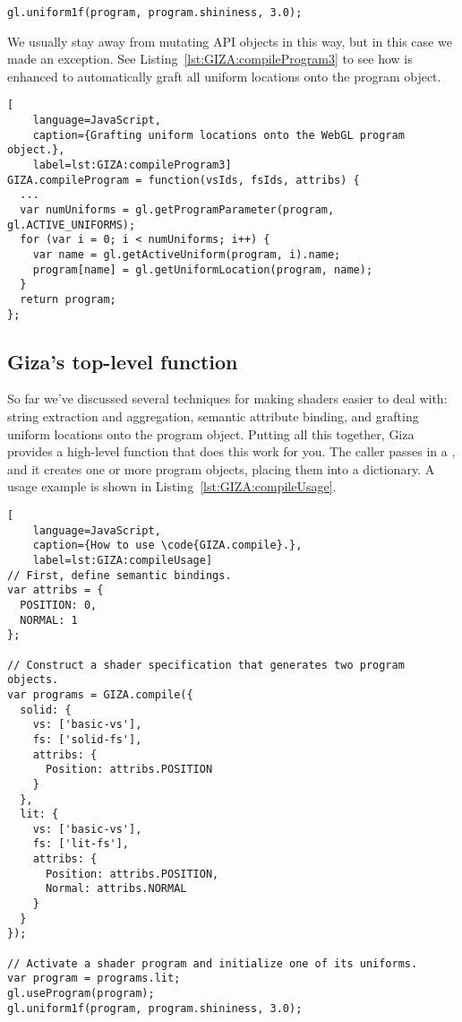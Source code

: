 \begin{lstlisting}
gl.uniform1f(program, program.shininess, 3.0);
\end{lstlisting}

We usually stay away from mutating API objects in this way, but in this case we made an exception.  See Listing~\ref{lst:GIZA:compileProgram3} to see how  is enhanced to automatically graft all uniform locations onto the program object.

\begin{lstlisting}[
    language=JavaScript,
    caption={Grafting uniform locations onto the WebGL program object.},
    label=lst:GIZA:compileProgram3]
GIZA.compileProgram = function(vsIds, fsIds, attribs) {
  ...
  var numUniforms = gl.getProgramParameter(program, gl.ACTIVE_UNIFORMS);
  for (var i = 0; i < numUniforms; i++) {
    var name = gl.getActiveUniform(program, i).name;
    program[name] = gl.getUniformLocation(program, name);
  }
  return program;
};
\end{lstlisting}

\subsection{Giza's top-level  function}

So far we've discussed several techniques for making shaders easier to deal with: string extraction and aggregation, semantic attribute binding, and grafting uniform locations onto the program object.  Putting all this together, Giza provides a high-level  function that does this work for you.  The caller passes in a , and it creates one or more program objects, placing them into a dictionary.  A usage example is shown in Listing~\ref{lst:GIZA:compileUsage}.

\begin{lstlisting}[
    language=JavaScript,
    caption={How to use \code{GIZA.compile}.},
    label=lst:GIZA:compileUsage]
// First, define semantic bindings.
var attribs = {
  POSITION: 0,
  NORMAL: 1
};

// Construct a shader specification that generates two program objects.
var programs = GIZA.compile({
  solid: {
    vs: ['basic-vs'],
    fs: ['solid-fs'],
    attribs: {
      Position: attribs.POSITION
    }
  },
  lit: {
    vs: ['basic-vs'],
    fs: ['lit-fs'],
    attribs: {
      Position: attribs.POSITION,
      Normal: attribs.NORMAL
    }
  }
});

// Activate a shader program and initialize one of its uniforms.
var program = programs.lit;
gl.useProgram(program);
gl.uniform1f(program, program.shininess, 3.0);
\end{lstlisting}

